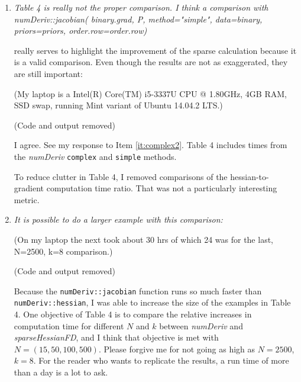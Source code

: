 \documentclass{article}
\newcommand{\pkg}[1]{\emph{#1}}
\newcommand{\code}[1]{\texttt{#1}}
\newcommand{\func}[1]{\code{#1}}
\newcommand{\method}[1]{\func{#1}}
\newenvironment{revQuote}{\itshape}{\vspace{\baselineskip}}
\newenvironment{response}{\normalfont}{\vspace{\baselineskip}}
\begin{document}
\begin{enumerate}[align=left]
\item\begin{revQuote}
Table 4 is really not the proper comparison. I think a comparison with
       numDeriv::jacobian( binary.grad, P, method="simple", 
                   data=binary, priors=priors,
order.row=order.row)

really serves to highlight the improvement of the sparse calculation because
it is a valid comparison. Even though the results are not as exaggerated,
they are still important:

(My laptop is a  Intel(R) Core(TM) i5-3337U CPU @ 1.80GHz,  4GB RAM, SSD
swap, running Mint variant of Ubuntu 14.04.2 LTS.)

(Code and output removed)
  \end{revQuote}
  
  \begin{response}
    I agree.  See my response to Item \ref{it:complex2}.  Table 4
    includes times from the \pkg{numDeriv}
    \method{complex} and \method{simple} methods.

    To reduce clutter in Table 4, I removed comparisons of the
    hessian-to-gradient computation time ratio.  That was not a
    particularly interesting metric.
    
  \end{response}

\item\begin{revQuote}
It is possible to do a larger example with this comparison:

(On my laptop the next took about 30 hrs of which 24 was for the last,
N=2500, k=8 comparison.)

(Code and output removed)

  \end{revQuote}
  
  \begin{response}
Because the \func{numDeriv::jacobian} function runs so much faster
than  \func{numDeriv::hessian}, I was able to increase the size of the
examples in Table 4. One objective of Table 4 is to compare the relative
increases in computation time for different $N$ and $k$ between
\pkg{numDeriv} and \pkg{sparseHessianFD}, and I think that objective
is met with $N=(15, 50, 100, 500)$.  Please forgive me for not going as high as
$N=2500$, $k=8$. For the reader who wants to
replicate the results, a run time of more than a day is a lot to ask.
  \end{response}


\end{enumerate}
\end{document}
